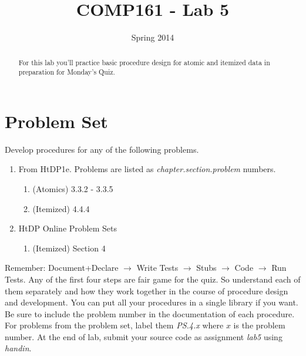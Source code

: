 \documentclass[]{tufte-handout}
\title{COMP161 - Lab 5}
\author{}
\date{Spring 2014}
\begin{document}
\maketitle

\begin{abstract}
For this lab you'll practice basic procedure design for atomic and itemized data in preparation for Monday's Quiz.
\end{abstract}

\section{Problem Set}

Develop procedures for any of the following problems. 
\begin{enumerate}
\item From HtDP1e. Problems are listed as \textit{chapter.section.problem} numbers.
\begin{enumerate}
\item (Atomics) 3.3.2 - 3.3.5
\item (Itemized) 4.4.4
\end{enumerate}
\item HtDP Online Problem Sets
\begin{enumerate}
\item (Itemized) Section 4
\end{enumerate}
\end{enumerate}
 
Remember: Document+Declare $\rightarrow$ Write Tests $\rightarrow$ Stubs $\rightarrow$ Code $\rightarrow$ Run Tests. Any of the first four steps are fair game for the quiz. So understand each of them separately and how they work together in the course of procedure design and development. You can put all your procedures in a single library if you want.  Be sure to include the problem number in the documentation of each procedure. For problems from the problem set, label them \textit{PS.4.x} where $x$ is the problem number. At the end of lab, submit your source code as assignment \textit{lab5} using \textit{handin}.
\end{document}
